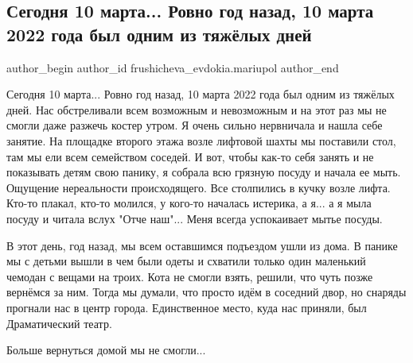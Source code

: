  
 
 
 
 

\subsection{Сегодня 10 марта... Ровно год назад, 10 марта 2022 года был одним из тяжёлых дней}
\label{sec:10_03_2023.fb.frushicheva_evdokia.mariupol.1.10_marta_2022_tjazhelyj_den}

\ifcmt
 author_begin
   author_id frushicheva_evdokia.mariupol
 author_end
\fi

Сегодня 10 марта... Ровно год назад, 10 марта 2022 года был одним из тяжёлых
дней. Нас обстреливали всем возможным и невозможным и на этот раз мы не смогли
даже разжечь костер утром. Я очень сильно нервничала и нашла себе занятие. На
площадке второго этажа возле лифтовой шахты  мы поставили стол, там мы ели всем
семейством соседей. И вот, чтобы как-то себя занять и не показывать детям свою
панику, я собрала всю грязную посуду и начала ее мыть. Ощущение нереальности
происходящего. Все столпились в кучку возле лифта. Кто-то плакал, кто-то
молился, у кого-то началась истерика, а я... а я мыла посуду и читала вслух
"Отче наш"... Меня всегда успокаивает мытье посуды.

В этот день, год назад, мы всем оставшимся подъездом ушли из дома. В панике мы
с детьми вышли в чем были одеты и схватили только один маленький чемодан с
вещами на троих. Кота не смогли взять, решили, что чуть позже вернёмся за ним.
Тогда мы думали, что просто идём в соседний двор, но снаряды прогнали нас в
центр города. Единственное место, куда нас приняли, был Драматический театр.

Больше вернуться домой мы не смогли...

